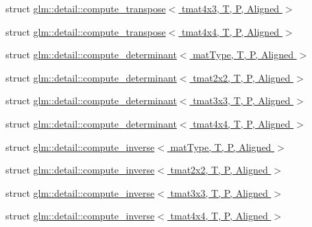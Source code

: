 \begin{DoxyCompactItemize}
\item 
struct \hyperlink{structglm_1_1detail_1_1compute__transpose_3_01tmat4x3_00_01T_00_01P_00_01Aligned_01_4}{glm\+::detail\+::compute\+\_\+transpose$<$ tmat4x3, T, P, Aligned $>$}
\item 
struct \hyperlink{structglm_1_1detail_1_1compute__transpose_3_01tmat4x4_00_01T_00_01P_00_01Aligned_01_4}{glm\+::detail\+::compute\+\_\+transpose$<$ tmat4x4, T, P, Aligned $>$}
\item 
struct \hyperlink{structglm_1_1detail_1_1compute__determinant}{glm\+::detail\+::compute\+\_\+determinant$<$ mat\+Type, T, P, Aligned $>$}
\item 
struct \hyperlink{structglm_1_1detail_1_1compute__determinant_3_01tmat2x2_00_01T_00_01P_00_01Aligned_01_4}{glm\+::detail\+::compute\+\_\+determinant$<$ tmat2x2, T, P, Aligned $>$}
\item 
struct \hyperlink{structglm_1_1detail_1_1compute__determinant_3_01tmat3x3_00_01T_00_01P_00_01Aligned_01_4}{glm\+::detail\+::compute\+\_\+determinant$<$ tmat3x3, T, P, Aligned $>$}
\item 
struct \hyperlink{structglm_1_1detail_1_1compute__determinant_3_01tmat4x4_00_01T_00_01P_00_01Aligned_01_4}{glm\+::detail\+::compute\+\_\+determinant$<$ tmat4x4, T, P, Aligned $>$}
\item 
struct \hyperlink{structglm_1_1detail_1_1compute__inverse}{glm\+::detail\+::compute\+\_\+inverse$<$ mat\+Type, T, P, Aligned $>$}
\item 
struct \hyperlink{structglm_1_1detail_1_1compute__inverse_3_01tmat2x2_00_01T_00_01P_00_01Aligned_01_4}{glm\+::detail\+::compute\+\_\+inverse$<$ tmat2x2, T, P, Aligned $>$}
\item 
struct \hyperlink{structglm_1_1detail_1_1compute__inverse_3_01tmat3x3_00_01T_00_01P_00_01Aligned_01_4}{glm\+::detail\+::compute\+\_\+inverse$<$ tmat3x3, T, P, Aligned $>$}
\item 
struct \hyperlink{structglm_1_1detail_1_1compute__inverse_3_01tmat4x4_00_01T_00_01P_00_01Aligned_01_4}{glm\+::detail\+::compute\+\_\+inverse$<$ tmat4x4, T, P, Aligned $>$}
\end{DoxyCompactItemize}
